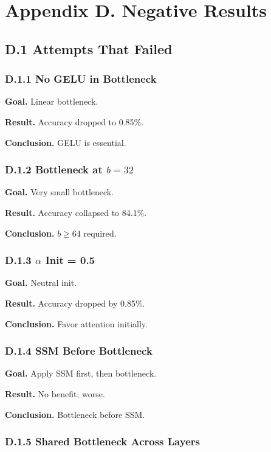 \section{Appendix D. Negative Results}

\subsection{D.1 Attempts That Failed}

\subsubsection{D.1.1 No GELU in Bottleneck}

\textbf{Goal.} Linear bottleneck.

\textbf{Result.} Accuracy dropped to 0.85\%.

\textbf{Conclusion.} GELU is essential.

\subsubsection{D.1.2 Bottleneck at $b = 32$}

\textbf{Goal.} Very small bottleneck.

\textbf{Result.} Accuracy collapsed to 84.1\%.

\textbf{Conclusion.} $b \geq 64$ required.

\subsubsection{D.1.3 $\alpha$ Init = 0.5}

\textbf{Goal.} Neutral init.

\textbf{Result.} Accuracy dropped by 0.85\%.

\textbf{Conclusion.} Favor attention initially.

\subsubsection{D.1.4 SSM Before Bottleneck}

\textbf{Goal.} Apply SSM first, then bottleneck.

\textbf{Result.} No benefit; worse.

\textbf{Conclusion.} Bottleneck before SSM.

\subsubsection{D.1.5 Shared Bottleneck Across Layers}

